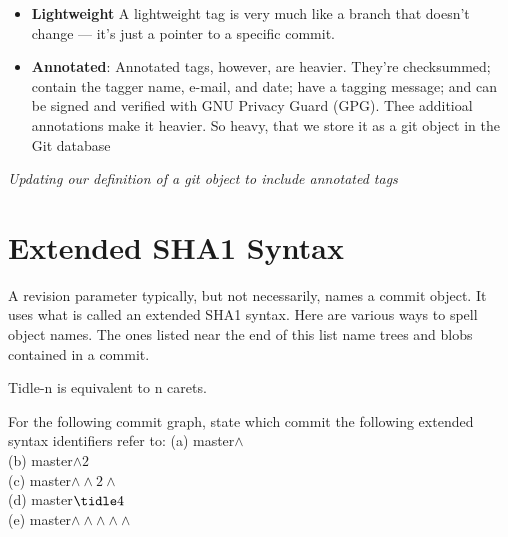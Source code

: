 \begin{itemize}
  \item \textbf{Lightweight} A lightweight tag is very 
    much like a branch that doesn’t change — it’s
    just a pointer to a specific commit.
  \item \textbf{Annotated}: Annotated tags, however, are heavier.
    They’re checksummed; contain the tagger name,
    e-mail, and date; have a tagging message; and can be signed and verified with GNU
    Privacy Guard (GPG). Thee additioal annotations make it heavier. So heavy, 
    that we store it as a git object in the Git database
\end{itemize}


\frmrule 

\textit{Updating our definition of a git object to include annotated tags}



\section{Extended SHA1 Syntax}

A revision parameter typically, but not necessarily, names a
commit object. It uses what is called an extended SHA1 syntax. Here are
various ways to spell object names. The ones listed near the end of this
list name trees and blobs contained in a commit.


Tidle-n is equivalent to n carets. 

\frmrule 

\begin{example}
For the following commit graph, state which commit
the following extended syntax identifiers
refer to:
(a) master$\wedge$ \\
(b) master$\wedge2$ \\
(c) master$\wedge\wedge 2\wedge$ \\
(d) master$\tidle 4$ \\
(e) master$\wedge\wedge\wedge\wedge\wedge$
\end{example}


